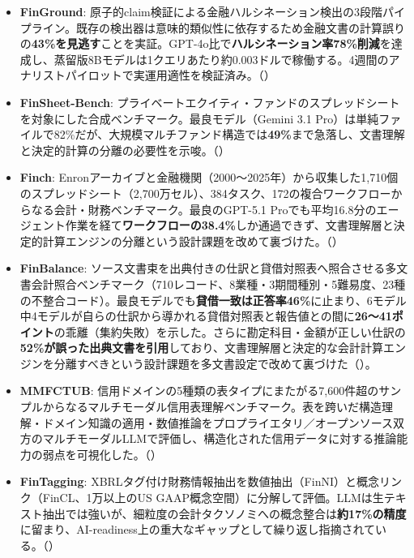 \begin{itemize}
  \item \textbf{FinGround}: 原子的claim検証による金融ハルシネーション検出の3段階パイプライン。既存の検出器は意味的類似性に依存するため金融文書の計算誤りの\textbf{43\%を見逃す}ことを実証。GPT-4o比で\textbf{ハルシネーション率78\%削減}を達成し、蒸留版8Bモデルは1クエリあたり約0.003ドルで稼働する。4週間のアナリストパイロットで実運用適性を検証済み。（\cite{finground2026}）
  \item \textbf{FinSheet-Bench}: プライベートエクイティ・ファンドのスプレッドシートを対象にした合成ベンチマーク。最良モデル（Gemini 3.1 Pro）は単純ファイルで82\%だが、大規模マルチファンド構造では\textbf{49\%}まで急落し、文書理解と決定的計算の分離の必要性を示唆。（\cite{finsheetbench2026}）
  \item \textbf{Finch}: Enronアーカイブと金融機関（2000〜2025年）から収集した1,710個のスプレッドシート（2,700万セル）、384タスク、172の複合ワークフローからなる会計・財務ベンチマーク。最良のGPT-5.1 Proでも平均16.8分のエージェント作業を経て\textbf{ワークフローの38.4\%}しか通過できず、文書理解層と決定的計算エンジンの分離という設計課題を改めて裏づけた。（\cite{finchbench2025}）
  \item \textbf{FinBalance}: ソース文書束を出典付きの仕訳と貸借対照表へ照合させる多文書会計照合ベンチマーク（710レコード、8業種・3期間種別・5難易度、23種の不整合コード）。最良モデルでも\textbf{貸借一致は正答率46\%}に止まり、6モデル中4モデルが自らの仕訳から導かれる貸借対照表と報告値との間に\textbf{26〜41ポイント}の乖離（集約失敗）を示した。さらに勘定科目・金額が正しい仕訳の\textbf{52\%が誤った出典文書を引用}しており、文書理解層と決定的な会計計算エンジンを分離すべきという設計課題を多文書設定で改めて裏づけた（\cite{x02finbalance2026}）。
  \item \textbf{MMFCTUB}: 信用ドメインの5種類の表タイプにまたがる7,600件超のサンプルからなるマルチモーダル信用表理解ベンチマーク。表を跨いだ構造理解・ドメイン知識の適用・数値推論をプロプライエタリ／オープンソース双方のマルチモーダルLLMで評価し、構造化された信用データに対する推論能力の弱点を可視化した。（\cite{mmfctub2026}）
  \item \textbf{FinTagging}: XBRLタグ付け財務情報抽出を数値抽出（FinNI）と概念リンク（FinCL、1万以上のUS GAAP概念空間）に分解して評価。LLMは生テキスト抽出では強いが、細粒度の会計タクソノミへの概念整合は\textbf{約17\%の精度}に留まり、AI-readiness上の重大なギャップとして繰り返し指摘されている。（\cite{fintagging2025}）
\end{itemize}

